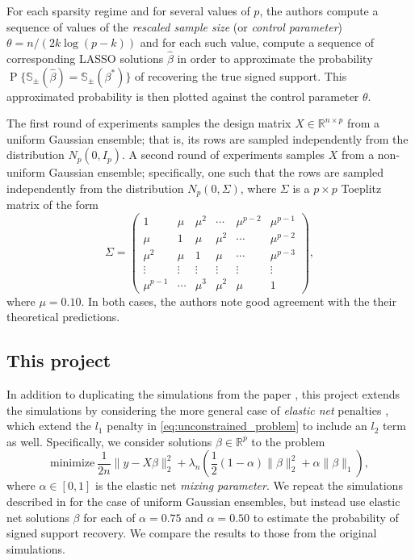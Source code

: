 \documentclass[letterpaper,12pt]{article}
\DeclareMathOperator{\prob}{P}
\newcommand{\norm}[1]{\lVert#1\rVert}
\begin{document}
For each sparsity regime and for several values of $p$, the authors
compute a sequence of values of the \textit{rescaled sample size} (or
\textit{control parameter}) $\theta = n / (2k \log(p -k))$ and for
each such value, compute a sequence of corresponding LASSO solutions
$\hat{\beta}$ in order to approximate the probability
$\prob\{\mathbb{S}_\pm(\hat{\beta}) = \mathbb{S}_\pm(\beta^\ast)\}$ of
recovering the true signed support. This approximated probability is
then plotted against the control parameter $\theta$.

The first round of experiments samples the design matrix
$X \in \mathbb{R}^{n \times p}$ from a uniform Gaussian ensemble; that
is, its rows are sampled independently from the distribution
$N_p(0, I_p)$. A second round of experiments samples $X$ from a
non-uniform Gaussian ensemble; specifically, one such that the rows
are sampled independently from the distribution $N_p(0, \Sigma)$,
where $\Sigma$ is a $p \times p$ Toeplitz matrix of the form
\begin{equation} \label{eq:toeplitz_covariance}
  \Sigma =
  \begin{pmatrix}
    1 & \mu & \mu^2 & \cdots & \mu^{p-2} & \mu^{p-1} \\
    \mu & 1 & \mu & \mu^2 & \cdots & \mu^{p-2} \\
    \mu^2 & \mu & 1 & \mu & \cdots & \mu^{p-3} \\
    \vdots & \vdots & \vdots & \vdots & \vdots & \vdots \\
    \mu^{p-1} & \cdots & \mu^3 & \mu^2 & \mu & 1
  \end{pmatrix},
\end{equation}
where $\mu = 0.10$. In both cases, the authors note good agreement
with the their theoretical predictions.

\subsection*{This project}

In addition to duplicating the simulations from the paper
\cite{wainwright06}, this project extends the simulations by
considering the more general case of \textit{elastic net} penalties
\cite{zou_hastie05}, which extend the $l_1$ penalty in
\eqref{eq:unconstrained_problem} to include an $l_2$ term as
well. Specifically, we consider solutions $\beta \in \mathbb{R}^p$ to
the problem
\begin{equation} \label{eq:elastic_net_problem}
  \text{minimize} \
    \frac{1}{2n} \norm{y - X\beta}_2^2
      + \lambda_n \left( \frac{1}{2} (1 - \alpha) \norm{\beta}_2^2
      + \alpha \norm{\beta}_1 \right ),
\end{equation}
where $\alpha \in [0, 1]$ is the elastic net \textit{mixing
  parameter}. We repeat the simulations described in
\cite{wainwright06} for the case of uniform Gaussian ensembles, but
instead use elastic net solutions $\beta$ for each of $\alpha = 0.75$
and $\alpha = 0.50$ to estimate the probability of signed support
recovery. We compare the results to those from the original
simulations.
\end{document}
